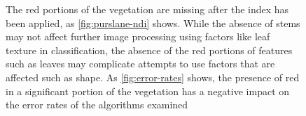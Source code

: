 \documentclass[letterpaper]{article}
\begin{document}
{{\begin{figure}[H]
	\centering
	\hfill
	\hfill
	\caption[Missing red portions of vegetation]{The red portions of the vegetation are missing after the index has been applied, as \ref{fig:purslane-ndi} shows. While the absence of stems may not affect further image processing using factors like leaf texture in classification, the absence of the red portions of features such as leaves may complicate attempts to use factors that are affected such as shape. As \ref{fig:error-rates} shows, the presence of red in a significant portion of the vegetation has a negative impact on the error rates of the algorithms examined}
	\label{fig:segmentation-color-problem}
\end{figure}

}}
\end{document}
